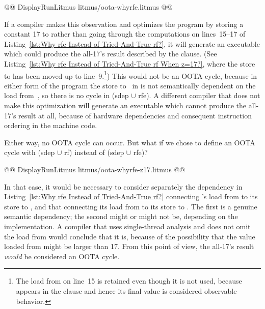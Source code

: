 \documentclass[10]{article}
\begin{document}
\begin{listing}[tbp]
@@ DisplayRunLitmus litmus/oota-whyrfe.litmus @@
\caption{Why rfe Instead of Tried-And-True rf?}
\label{lst:Why rfe Instead of Tried-And-True rf?}
\end{listing}

If a compiler makes this observation and optimizes the program by
storing a constant 17 to  rather than going through the
computations on lines~15--17 of
Listing~\ref{lst:Why rfe Instead of Tried-And-True rf?},
it will generate an executable which could produce the all-17's result
described by the  clause.
(See Listing~\ref{lst:Why rfe Instead of Tried-And-True rf When z=17?},
where the store to  has been moved up to line~9.\footnote{
	The load from  on line~15 is retained even though it is
	not used, because  appears in the  clause and
	hence its final value is considered observable behavior.})
This would not be an OOTA cycle, because in either form of the program
the store to~ in  is not semantically dependent on the
load from~, so there is no cycle in (sdep $\cup$ rfe).
A different compiler that does not make this optimization will
generate an executable which cannot produce the all-17's result at all,
because of hardware dependencies and consequent instruction ordering
in the machine code.

Either way, no OOTA cycle can occur.
But what if we chose to define an OOTA cycle with (sdep $\cup$ rf) instead
of (sdep $\cup$ rfe)?

\begin{listing}[tbp]
@@ DisplayRunLitmus litmus/oota-whyrfe-z17.litmus @@
\caption{Why rfe Instead of Tried-And-True rf When z=17?}
\label{lst:Why rfe Instead of Tried-And-True rf When z=17?}
\end{listing}

In that case, it would be necessary to consider separately the dependency
in Listing~\ref{lst:Why rfe Instead of Tried-And-True rf?}
connecting 's load from  to its store to ,
and that connecting its load from  to its store to .
The first is a genuine semantic dependency; the second might or might
not be, depending on the implementation.
A compiler that uses single-thread analysis and does not omit the load
from  would conclude that it is, because of the
possibility that the value loaded from  might be larger than 17.
From this point of view, the all-17's result \emph{would} be
considered an OOTA cycle.
\end{document}
